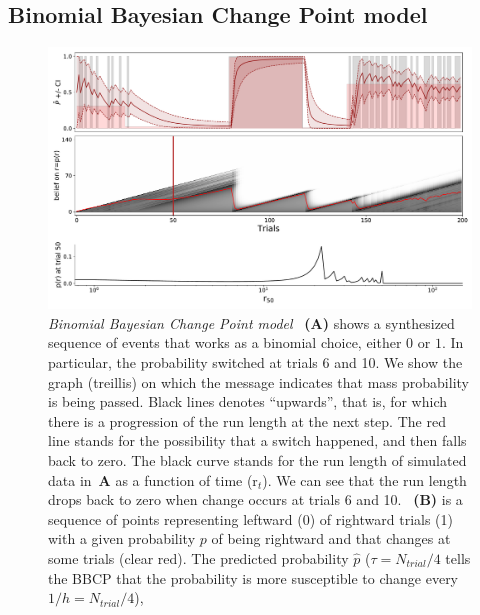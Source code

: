 \documentclass[12pt,english]{article}%
\newcommand{\seeFig}[1]{Figure~\ref{fig:#1}}
\newcommand{\AM}[1]{\textbf{\textcolor{blue}{[AM: #1]}}}
\begin{document}
\subsection{Binomial Bayesian Change Point model}
\begin{figure}%
\begin{center}
\includegraphics[width=1\linewidth]{3_BCP_readouts}
\end{center}
\caption{\emph{Binomial Bayesian Change Point model}
~\textbf{(A)} shows a synthesized sequence of events that works as a binomial choice, either $0$ or $1$.
In particular, the probability switched at trials 6 and 10.
We show the graph (treillis) on which the message indicates that
mass probability is being passed.
Black lines denotes ``upwards'',
that is, for which there is a progression of the run length at the next step.
The red line stands for the possibility that a switch happened,
and then falls back to zero.
The black curve stands for
the run length of simulated data in~\textbf{A}
as a function of time (r$_t$).
We can see that
the run length drops back to zero
when change occurs at trials 6 and 10.
~\textbf{(B)} is a sequence of points representing
leftward (0) of rightward trials (1)
with a given probability $p$ of being rightward and
that changes at some trials (clear red).
The predicted probability $\hat{p}$ ($\tau=N_{trial}/4$ tells the BBCP
that the probability is more susceptible to change every $1/h=N_{trial}/4$),
}
\end{figure}
\end{document}
